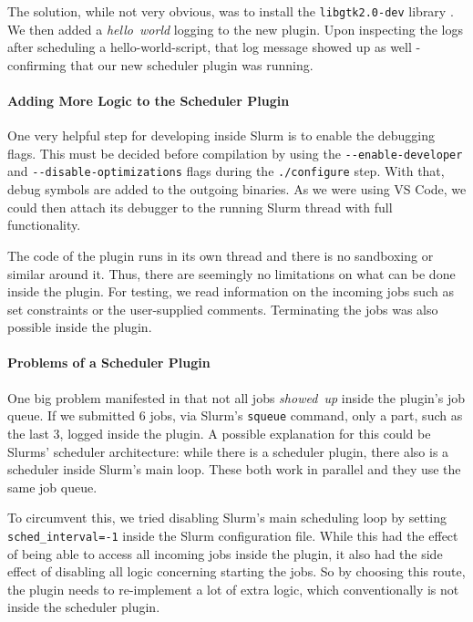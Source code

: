 The solution, while not very obvious, was to install the \verb|libgtk2.0-dev| library .
We then added a \emph{hello~world} logging to the new plugin. Upon inspecting the logs after scheduling a hello-world-script, that log message showed up as well - confirming that our new scheduler plugin was running.

\paragraph{Adding More Logic to the Scheduler Plugin}

One very helpful step for developing inside Slurm is to enable the debugging flags.
This must be decided before compilation by using the \verb|--enable-developer| and \verb|--disable-optimizations| flags during the \verb|./configure| step. 
With that, debug symbols are added to the outgoing binaries. 
As we were using VS Code, we could then attach its debugger to the running Slurm thread with full functionality.

The code of the plugin runs in its own thread and there is no sandboxing or similar around it.
Thus, there are seemingly no limitations on what can be done inside the plugin. 
For testing, we read information on the incoming jobs such as set constraints or the user-supplied comments. Terminating the jobs was also possible inside the plugin.

\paragraph{Problems of a Scheduler Plugin}

One big problem manifested in that not all jobs \emph{showed~up} inside the plugin's job queue. 
If we submitted 6 jobs, via Slurm's \verb|squeue| command, only a part, such as the last 3, logged inside the plugin.
A possible explanation for this could be Slurms' scheduler architecture: while there is a scheduler plugin, there also is a scheduler inside Slurm's main loop. These both work in parallel  and they use the same job queue.

To circumvent this, we tried disabling Slurm's main scheduling loop by setting \verb|sched_interval=-1| inside the Slurm configuration file. 
While this had the effect of being able to access all incoming jobs inside the plugin, it also had the side effect of disabling all logic concerning starting the jobs.
So by choosing this route, the plugin needs to re-implement a lot of extra logic, which conventionally is not inside the scheduler plugin. 


